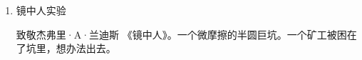 \documentclass{tstextbook}
\begin{document}
\begin{enumerate}

\item{镜中人实验}

致敬杰弗里·A·兰迪斯 《镜中人》。一个微摩擦的半圆巨坑。一个矿工被困在了坑里，想办法出去。

\end{enumerate}


\printbibliography{}


\printindex
\end{document}
